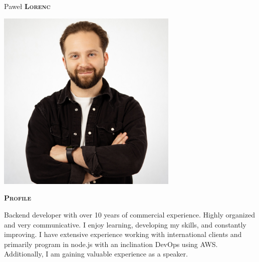 \documentclass[11pt, a4paper]{article}
\newcommand{\headleft}[1]{\vspace*{3ex}\textsc{\textbf{#1}}\par%
    \vspace*{-1.5ex}\hrulefill\par\vspace*{0.7ex}}
\begin{document}
\setlength{\topskip}{0pt}
\setlength{\parindent}{0pt}
\setlength{\parskip}{0pt}
\setlength{\fboxsep}{0pt}
\pagestyle{empty}
\raggedbottom

\begin{minipage}[t]{0.33\textwidth} %
\colorbox{cvblue}{\begin{minipage}[t][5mm][t]
{\textwidth}\null\hfill\null\end{minipage}}

\vspace{-.2ex} %
\colorbox{cvblue!90}{\color{white}  %
\textwidth\relax%
\begin{minipage}[t][293mm][t]{0.82\textwidth}
\raggedright
\vspace*{2.5ex}

{\centering \Large Paweł \textbf{\textsc{Lorenc}} \normalsize\par}

\null\hfill\includegraphics[width=0.65\textwidth]{pawel_lorenc.jpg}\hfill\null

\vspace*{0.5ex} %

\headleft{Profile}
Backend developer with over 10 years of commercial experience. Highly organized and very communicative. I enjoy learning, developing my skills, and constantly improving. I have extensive experience working with international clients and primarily program in node.js with an inclination DevOps using AWS. Additionally, I am gaining valuable experience as a speaker.


\end{minipage}}
\end{minipage}
\end{document}
